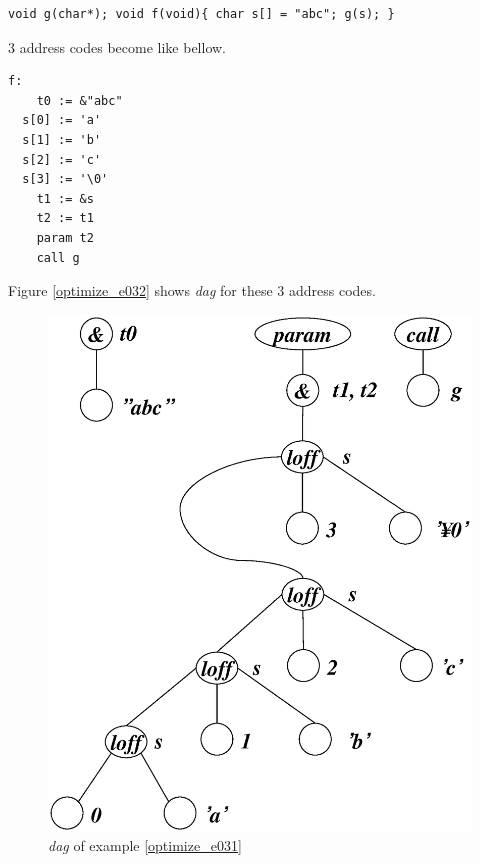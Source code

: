 \begin{Example}
\label{optimize_e031}
\begin{verbatim}
void g(char*); void f(void){ char s[] = "abc"; g(s); }
\end{verbatim}
3 address codes become like bellow.
\begin{verbatim}
f:
    t0 := &"abc"
  s[0] := 'a'
  s[1] := 'b'
  s[2] := 'c'
  s[3] := '\0'
    t1 := &s
    t2 := t1
    param t2
    call g
\end{verbatim}
Figure \ref{optimize_e032} shows {\em dag} for these 3 address codes.
\begin{figure}[htbp]
\begin{center}
\includegraphics[width=1.0\linewidth,height=1.2\linewidth]{opt016.eps}
\caption{{\em dag} of example \ref{optimize_e031}}

\end{center}
\end{figure}
\end{Example}
